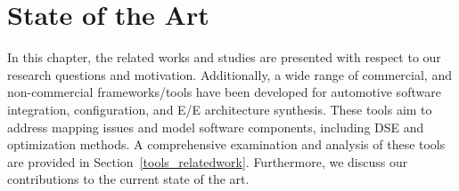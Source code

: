 \chapter{State of the Art}\label{sota}%

In this chapter, the related works and studies are presented with respect to our research questions and motivation. Additionally,
a wide range of commercial, and non-commercial frameworks/tools have been developed for automotive software integration, configuration, and E/E architecture synthesis. These tools aim to address mapping issues and model software components, including DSE and optimization methods. A comprehensive examination and analysis of these tools are provided in Section~\ref{tools_relatedwork}. Furthermore, we discuss our contributions to the current state of the art.










